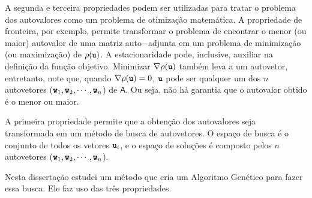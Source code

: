 	A segunda e terceira propriedades podem ser utilizadas para tratar o problema dos autovalores como um problema de otimização matemática. A propriedade de fronteira, por exemplo, permite transformar o problema de encontrar o menor (ou maior) autovalor de uma matriz auto$-$adjunta em um problema de minimização (ou maximização) de $\rho(\textbf{\texttt{u}})$. A estacionaridade pode, inclusive, auxiliar na definição da função objetivo. Minimizar $\nabla \rho(\textbf{\texttt{u}})$ também leva a um autovetor, entretanto, note que, quando $\nabla \rho(\textbf{\texttt{u}}) = 0$, $\textbf{\texttt{u}}$ pode ser qualquer um dos $n$ autovetores ($\textbf{\texttt{w}}_1, \textbf{\texttt{w}}_2, \cdots, \textbf{\texttt{w}}_n$) de $\mathsf{A}$. Ou seja, não há garantia que o autovalor obtido é o menor ou maior.

		A primeira propriedade permite que a obtenção dos autovalores seja transformada em um método de busca de autovetores. O espaço de busca é o conjunto de todos os vetores $\textbf{\texttt{u}}_i$, e o espaço de soluções é composto pelos $n$ autovetores ($\textbf{\texttt{w}}_1, \textbf{\texttt{w}}_2, \cdots, \textbf{\texttt{w}}_n$).
		
		Nesta dissertação estudei um método que cria um Algoritmo Genético para fazer essa busca. Ele faz uso das três propriedades.